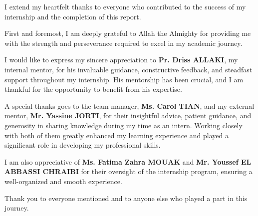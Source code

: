 I extend my heartfelt thanks to everyone who contributed to the success of my internship and the completion of this report.

First and foremost, I am deeply grateful to Allah the Almighty for providing me with the strength and perseverance required to excel in my academic journey.

I would like to express my sincere appreciation to \textbf{Pr. Driss ALLAKI}, my internal mentor, for his invaluable guidance, constructive feedback, and steadfast support throughout my internship. His mentorship has been crucial, and I am thankful for the opportunity to benefit from his expertise.

A special thanks goes to the team manager, \textbf{Ms. Carol TIAN}, and my external mentor, \textbf{Mr. Yassine JORTI}, for their insightful advice, patient guidance, and generosity in sharing knowledge during my time as an intern. Working closely with both of them greatly enhanced my learning experience and played a significant role in developing my professional skills.

I am also appreciative of \textbf{Ms. Fatima Zahra MOUAK} and \textbf{Mr. Youssef EL ABBASSI CHRAIBI} for their oversight of the internship program, ensuring a well-organized and smooth experience.

Thank you to everyone mentioned and to anyone else who played a part in this journey.